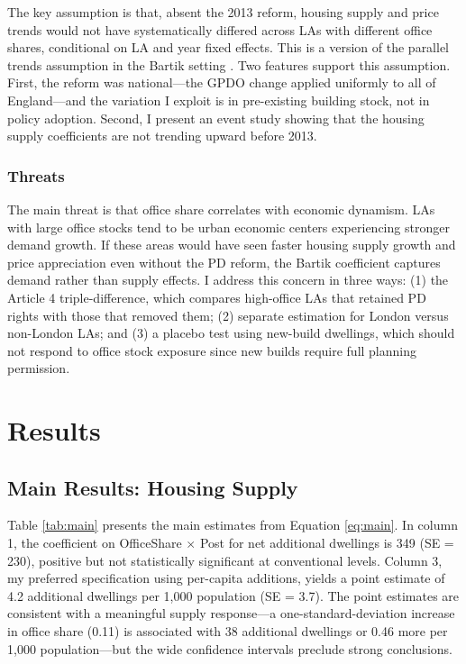 \documentclass[12pt]{article}
\begin{document}
The key assumption is that, absent the 2013 reform, housing supply and price trends would not have systematically differed across LAs with different office shares, conditional on LA and year fixed effects. This is a version of the parallel trends assumption in the Bartik setting \citep{goldsmith2020}. Two features support this assumption. First, the reform was national---the GPDO change applied uniformly to all of England---and the variation I exploit is in pre-existing building stock, not in policy adoption. Second, I present an event study showing that the housing supply coefficients are not trending upward before 2013.

\subsubsection*{Threats} The main threat is that office share correlates with economic dynamism. LAs with large office stocks tend to be urban economic centers experiencing stronger demand growth. If these areas would have seen faster housing supply growth and price appreciation even without the PD reform, the Bartik coefficient captures demand rather than supply effects. I address this concern in three ways: (1) the Article 4 triple-difference, which compares high-office LAs that retained PD rights with those that removed them; (2) separate estimation for London versus non-London LAs; and (3) a placebo test using new-build dwellings, which should not respond to office stock exposure since new builds require full planning permission.


\section{Results}

\subsection{Main Results: Housing Supply}

Table \ref{tab:main} presents the main estimates from Equation \ref{eq:main}. In column 1, the coefficient on OfficeShare $\times$ Post for net additional dwellings is 349 (SE = 230), positive but not statistically significant at conventional levels. Column 3, my preferred specification using per-capita additions, yields a point estimate of 4.2 additional dwellings per 1,000 population (SE = 3.7). The point estimates are consistent with a meaningful supply response---a one-standard-deviation increase in office share (0.11) is associated with 38 additional dwellings or 0.46 more per 1,000 population---but the wide confidence intervals preclude strong conclusions.
\end{document}
